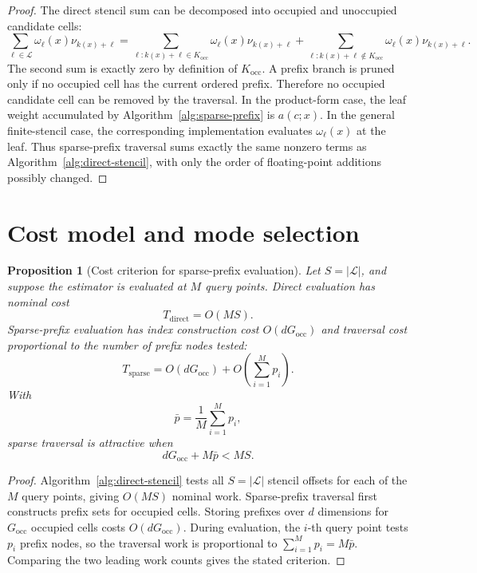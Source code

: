 \documentclass[pdflatex,sn-mathphys-ay]{sn-jnl}
\theoremstyle{thmstyleone}
\newtheorem{proposition}{Proposition}
\newcommand{\stencil}{\mathcal{L}}
\begin{document}
\begin{proof}
The direct stencil sum can be decomposed into occupied and unoccupied candidate cells:
\[
\sum_{\ell\in\stencil}
\omega_\ell(x)\nu_{k(x)+\ell}
=
\sum_{\ell:k(x)+\ell\in K_{\mathrm{occ}}}
\omega_\ell(x)\nu_{k(x)+\ell}
+
\sum_{\ell:k(x)+\ell\notin K_{\mathrm{occ}}}
\omega_\ell(x)\nu_{k(x)+\ell}.
\]
The second sum is exactly zero by definition of \(K_{\mathrm{occ}}\). A prefix branch is pruned only if no occupied cell has the current ordered prefix. Therefore no occupied candidate cell can be removed by the traversal. In the product-form case, the leaf weight accumulated by Algorithm~\ref{alg:sparse-prefix} is \(a(c;x)\). In the general finite-stencil case, the corresponding implementation evaluates \(\omega_\ell(x)\) at the leaf. Thus sparse-prefix traversal sums exactly the same nonzero terms as Algorithm~\ref{alg:direct-stencil}, with only the order of floating-point additions possibly changed.
\end{proof}

\section{Cost model and mode selection}
\label{sec:cost}

\begin{proposition}[Cost criterion for sparse-prefix evaluation]
\label{prop:cost-criterion}
Let \(S=|\stencil|\), and suppose the estimator is evaluated at \(M\) query points. Direct evaluation has nominal cost
\[
T_{\mathrm{direct}}=O(MS).
\]
Sparse-prefix evaluation has index construction cost \(O(dG_{\mathrm{occ}})\) and traversal cost proportional to the number of prefix nodes tested:
\[
T_{\mathrm{sparse}}
=
O(dG_{\mathrm{occ}})
+
O\left(\sum_{i=1}^M p_i\right).
\]
With
\[
\bar p
=
\frac{1}{M}\sum_{i=1}^M p_i,
\]
sparse traversal is attractive when
\[
dG_{\mathrm{occ}}+M\bar p
<
MS.
\]
\end{proposition}

\begin{proof}
Algorithm~\ref{alg:direct-stencil} tests all \(S=|\stencil|\) stencil offsets for each of the \(M\) query points, giving \(O(MS)\) nominal work. Sparse-prefix traversal first constructs prefix sets for occupied cells. Storing prefixes over \(d\) dimensions for \(G_{\mathrm{occ}}\) occupied cells costs \(O(dG_{\mathrm{occ}})\). During evaluation, the \(i\)-th query point tests \(p_i\) prefix nodes, so the traversal work is proportional to \(\sum_{i=1}^M p_i=M\bar p\). Comparing the two leading work counts gives the stated criterion.
\end{proof}
\end{document}
